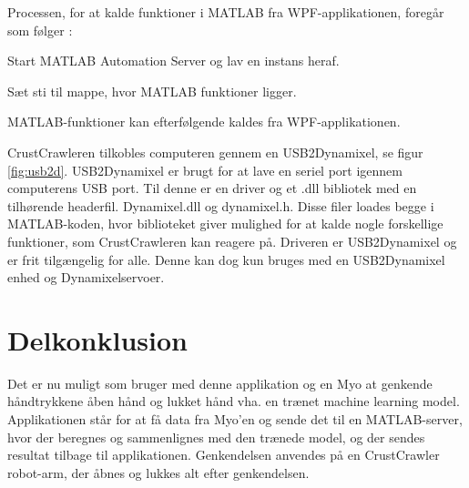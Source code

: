 
Processen, for at kalde funktioner i MATLAB fra WPF-applikationen, foregår som følger \citep{RefWorks:15}:
\begin{myEnumerate}
	\item Start MATLAB Automation Server og lav en instans heraf.
	\item Sæt sti til mappe, hvor MATLAB funktioner ligger.
	\item MATLAB-funktioner kan efterfølgende kaldes fra WPF-applikationen.
\end{myEnumerate}


CrustCrawleren tilkobles computeren gennem en USB2Dynamixel, se figur \ref{fig:usb2d}. USB2Dynamixel er brugt for at lave en seriel port igennem computerens USB port. Til denne er en driver og et .dll bibliotek med en tilhørende headerfil. Dynamixel.dll og dynamixel.h. Disse filer loades begge i MATLAB-koden, hvor biblioteket giver mulighed for at kalde nogle forskellige funktioner, som CrustCrawleren kan reagere på. Driveren er USB2Dynamixel \citep{agaverobot} og er frit tilgængelig for alle. Denne kan dog kun bruges med en USB2Dynamixel enhed og Dynamixelservoer.
\section{Delkonklusion}
Det er nu muligt som bruger med denne applikation og en Myo at genkende håndtrykkene åben hånd og lukket hånd vha. en trænet machine learning model. Applikationen står for at få data fra Myo'en og sende det til en MATLAB-server, hvor der beregnes og sammenlignes med den trænede model, og der sendes resultat tilbage til applikationen. Genkendelsen anvendes på en CrustCrawler robot-arm, der åbnes og lukkes alt efter genkendelsen.